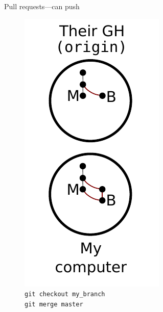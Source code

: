 \begin{frame}{Pull requests---can push}
  \begin{figure}
    \includegraphics{push_007.pdf}
    \\ \texttt{git checkout my\_branch}
    \\ \texttt{git merge master}
  \end{figure}
\end{frame}

